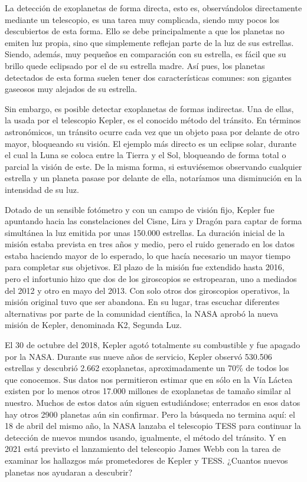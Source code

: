 La detección de exoplanetas de forma directa, esto es, observándolos directamente mediante un telescopio, es una tarea muy complicada, siendo muy pocos los descubiertos de esta forma. Ello se debe principalmente a que los planetas no emiten luz propia, sino que simplemente reflejan parte de la luz de sus estrellas. Siendo, además, muy pequeños en comparación con su estrella, es fácil que su brillo quede eclipsado por el de su estrella madre. Así pues, los planetas detectados de esta forma suelen tener dos características comunes: son gigantes gaseosos muy alejados de su estrella. 

Sin embargo, es posible detectar exoplanetas de formas indirectas. Una de ellas, la usada por el telescopio Kepler, es el conocido método del tránsito. En términos astronómicos, un tránsito ocurre cada vez que un objeto pasa por delante de otro mayor, bloqueando su visión. El ejemplo más directo es un eclipse solar, durante el cual la Luna se coloca entre la Tierra y el Sol, bloqueando de forma total o parcial la visión de este. De la misma forma, si estuviésemos observando cualquier estrella y un planeta pasase por delante de ella, notaríamos una disminución en la intensidad de su luz.

Dotado de un sensible fotómetro y con un campo de visión fijo, Kepler fue apuntando hacia las constelaciones del Cisne, Lira y Dragón para captar de forma simultánea la luz emitida por unas 150.000 estrellas. La duración inicial de la misión estaba prevista en tres años y medio, pero el ruido generado en los datos estaba haciendo mayor de lo esperado, lo que hacía necesario un mayor tiempo para completar sus objetivos. El plazo de la misión fue extendido hasta 2016, pero el infortunio hizo que dos de los giroscopios se estropearan, uno a mediados del 2012 y otro en mayo del 2013. Con solo otros dos giroscopios operativos, la misión original tuvo que ser abandona. En su lugar, tras escuchar diferentes alternativas por parte de la comunidad científica, la NASA aprobó la nueva misión de Kepler, denominada K2, Segunda Luz.    


El 30 de octubre del 2018, Kepler agotó totalmente su combustible y fue apagado por la NASA. Durante sus nueve años de servicio, Kepler observó 530.506 estrellas y descubrió 2.662 exoplanetas, aproximadamente un 70\% de todos los que conocemos. Sus datos nos permitieron estimar que en sólo en la Vía Láctea existen por lo menos otros 17.000 millones de exoplanetas de tamaño similar al nuestro. Muchos de estos datos aún siguen estudiándose; enterrados en esos datos hay otros 2900 planetas aún sin confirmar. Pero la búsqueda no termina aquí: el 18 de abril del mismo año, la NASA lanzaba el telescopio TESS para continuar la detección de nuevos mundos usando, igualmente, el método del tránsito. Y en 2021 está previsto el lanzamiento del telescopio James Webb con la tarea de examinar los hallazgos más prometedores de Kepler y TESS. ¿Cuantos nuevos planetas nos ayudaran a descubrir?

